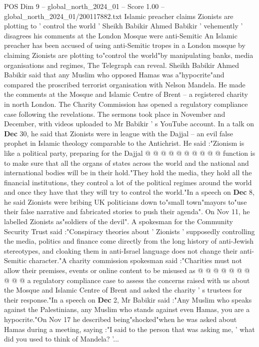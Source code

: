 \begin{textsample}{POS Dim 9 – global\_north\_2024\_01 – Score 1.00 – global\_north\_2024\_01/200117882.txt}  \label{ex:f9_pos_265}
Islamic preacher claims Zionists are plotting to ' control the world ' Sheikh Babikir Ahmed Babikir ' vehemently ' disagrees his comments at the London Mosque were anti-Semitic An Islamic preacher has been accused of using anti-Semitic tropes in a London mosque by claiming Zionists are plotting to"control the world"by manipulating banks, media organisations and regimes, The Telegraph can reveal.
Sheikh Babikir Ahmed Babikir said that any Muslim who opposed Hamas was a"hypocrite"and compared the proscribed terrorist organisation with Nelson Mandela.
He made the comments at the Mosque and Islamic Centre of Brent -- a registered charity in north London.
The Charity Commission has opened a regulatory compliance case following the revelations.
The sermons took place in November and December, with videos uploaded to Mr Babikir ' s YouTube account.
In a talk on \textbf{Dec} 30, he said that Zionists were in league with the Dajjal -- an evil false prophet in Islamic theology comparable to the Antichrist.
He said :"Zionism is like a political party, preparing for the Dajjal @ @ @ @ @ @ @ @ @ @ function is to make sure that all the organs of states across the world and the national and international bodies will be in their hold."They hold the media, they hold all the financial institutions, they control a lot of the political regimes around the world and once they have that they will try to control the world."In a speech on \textbf{Dec} 8, he said Zionists were bribing UK politicians down to"small town"mayors to"use their false narrative and fabricated stories to push their agenda".
On Nov 11, he labelled Zionists as"soldiers of the devil".
A spokesman for the Community Security Trust said :"Conspiracy theories about ' Zionists ' supposedly controlling the media, politics and finance come directly from the long history of anti-Jewish stereotypes, and cloaking them in anti-Israel language does not change their anti-Semitic character."A charity commission spokesman said :"Charities must not allow their premises, events or online content to be misused as @ @ @ @ @ @ @ @ @ @ a regulatory compliance case to assess the concerns raised with us about the Mosque and Islamic Centre of Brent and asked the charity ' s trustees for their response."In a speech on \textbf{Dec} 2, Mr Babikir said :"Any Muslim who speaks against the Palestinians, any Muslim who stands against even Hamas, you are a hypocrite."On Nov 17 he described being"shocked"when he was asked about Hamas during a meeting, saying :"I said to the person that was asking me, ' what did you used to think of Mandela? '...

\end{textsample}
